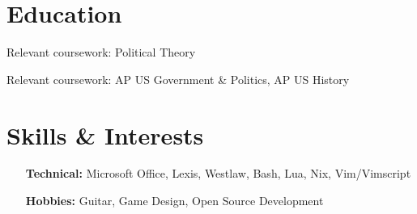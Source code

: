 \documentclass[letterpaper]{resume-shreeram}
\begin{document}
\section{Education}

\begin{compactitem}
  \item Relevant coursework: Political Theory
\end{compactitem}

\begin{compactitem}
  \item Relevant coursework: AP US Government \& Politics, AP US
    History
\end{compactitem}


\section{Skills \& Interests}

\begin{itemize}
  \item[\bfseries Technical:] Microsoft Office, Lexis, Westlaw, Bash,
    Lua, Nix, Vim/Vimscript

  \item[\bfseries Hobbies:] Guitar, Game Design, Open Source Development

\end{itemize}
\end{document}
